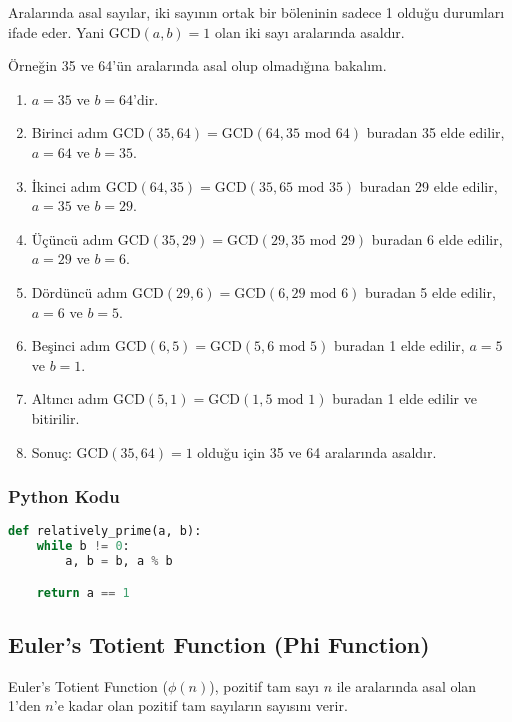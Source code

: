Aralarında asal sayılar, iki sayının ortak bir böleninin sadece 1 olduğu durumları ifade eder. Yani $\text{GCD}(a, b) = 1$ olan iki sayı aralarında asaldır.

Örneğin 35 ve 64'ün aralarında asal olup olmadığına bakalım.

\begin{enumerate}
    \item $a = 35$ ve $b = 64$'dir.
    \item Birinci adım $\text{GCD}(35, 64) = \text{GCD}(64, 35 \text{ mod } 64)$ buradan 35 elde edilir, $a = 64$ ve $b = 35$.
    \item İkinci adım $\text{GCD}(64, 35) = \text{GCD}(35, 65 \text{ mod } 35)$ buradan 29 elde edilir, $a = 35$ ve $b = 29$.
    \item Üçüncü adım $\text{GCD}(35, 29) = \text{GCD}(29, 35 \text{ mod } 29)$ buradan 6 elde edilir, $a = 29$ ve $b = 6$.
    \item Dördüncü adım $\text{GCD}(29, 6) = \text{GCD}(6, 29 \text{ mod } 6)$ buradan 5 elde edilir, $a = 6$ ve $b = 5$.
    \item Beşinci adım $\text{GCD}(6, 5) = \text{GCD}(5, 6 \text{ mod } 5)$ buradan 1 elde edilir, $a = 5$ ve $b = 1$.
    \item Altıncı adım $\text{GCD}(5, 1) = \text{GCD}(1, 5 \text{ mod } 1)$ buradan 1 elde edilir ve bitirilir.
    \item Sonuç: $\text{GCD}(35, 64) = 1$ olduğu için 35 ve 64 aralarında asaldır.
\end{enumerate}

\subsubsection{Python Kodu}

\begin{lstlisting}[language=Python]
def relatively_prime(a, b):
    while b != 0:
        a, b = b, a % b

    return a == 1
\end{lstlisting}

\newpage

\subsection{Euler's Totient Function (Phi Function)}

Euler's Totient Function ($\phi(n)$), pozitif tam sayı $n$ ile aralarında asal olan 1'den $n$'e kadar olan pozitif tam sayıların sayısını verir. 


